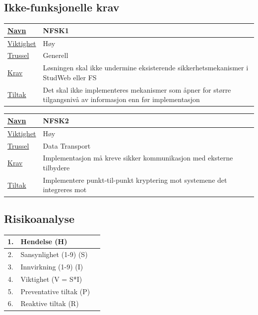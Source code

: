 \documentclass[12pt]{article}
\begin{document}
\subsection{Ikke-funksjonelle krav}

\begin{tabularx}{\textwidth}{|l|X|}
  \hline
  \underline{Navn} & NFSK1 \\ \hline
  \underline{Viktighet} & Høy \\ \hline
  \underline{Trussel} & Generell \\ \hline
  \underline{Krav} & Løsningen skal ikke undermine eksisterende sikkerhetsmekanismer i StudWeb eller FS \\ \hline
  \underline{Tiltak} & Det skal ikke implementeres mekanismer som åpner for større tilgangsnivå av informasjon enn før implementasjon \\ \hline
\end{tabularx}

\begin{tabularx}{\textwidth}{|l|X|}
  \hline
  \underline{Navn} & NFSK2 \\ \hline
  \underline{Viktighet} & Høy \\ \hline
  \underline{Trussel} & Data Transport \\ \hline
  \underline{Krav} & Implementasjon må kreve sikker kommunikasjon med eksterne tilbydere \\ \hline
  \underline{Tiltak} & Implementere punkt-til-punkt kryptering mot systemene det integreres mot \\ \hline
\end{tabularx}

\subsection{Risikoanalyse}

\begin{tabular}{c l l}
  1. & Hendelse (H)\\ \hline
  2. & Sansynlighet (1-9) (S) \\
  3. & Innvirkning (1-9) (I) \\
  4. & Viktighet (V = S*I) \\
  5. & Preventative tiltak (P) \\
  6. & Reaktive tiltak (R) \\
\end{tabular}
\end{document}
